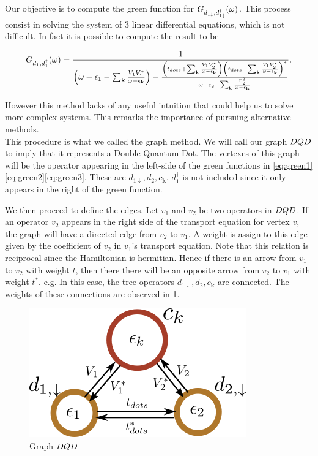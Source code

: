 Our objective is to compute the green function for $G_{d_{1\downarrow},d_{1\downarrow}^{\dagger}}(\omega)$. This process consist in solving the system of $3$ linear differential equations, which is not difficult.  In fact it is possible to compute the result to be 

\begin{equation}
G_{d_{1},d_{1}^{\dagger}}(\omega)=\frac{1}{\left(\omega-\epsilon_{1}-\sum_{\mathbf{k}}\frac{V_{1}V_{1}^{*}}{\omega-\epsilon_{\mathbf{k}}}\right)-\frac{\left(t_{dots}+\sum_{\mathbf{k}}\frac{V_{1}V_{2}^{*}}{\omega-\epsilon_{\mathbf{k}}}\right)\left(t_{dots}+\sum_{\mathbf{k}}\frac{V_{1}V_{2}^{*}}{\omega-\epsilon_{\mathbf{k}}}\right)^{*}}{\omega-\epsilon_{2}-\sum_{\mathbf{k}}\frac{\Gamma_{2}^{2}}{\omega-\epsilon_{\mathbf{k}}}}}. \label{eq:solGreen}
\end{equation}

However this method lacks of any useful intuition that could help us  to  solve more complex systems. This remarks the  importance of pursuing alternative methods. \\

This procedure is what we called the graph method.  We will call our graph $DQD$ to imply that it represents a Double Quantum Dot. The vertexes of this graph will be the operator appearing in the left-side of the green functions in  \eqref{eq:green1}\eqref{eq:green2}\eqref{eq:green3}. These  are $d_{1\downarrow},d_{2},c_{\boldsymbol{k}}$. $d_1^\dagger$ is not included since it only appears in the right of the green function. 

We then proceed to define the edges. Let $v_1$ and $v_2$ be two operators in $DQD$. If an operator $v_2$ appears in the right side of the transport equation for vertex $v$, the graph will have  a directed edge from $v_2$ to $v_1$. A weight is assign to this edge given by the coefficient of $v_2$ in $v_1$'s transport equation. Note that this relation is reciprocal since the Hamiltonian is hermitian. Hence if there is an arrow from $v_1$ to $v_2$ with weight $t$, then there there will be an opposite arrow from $v_2$ to $v_1$ with weight $t^*$. e.g. In this case, the tree operators  $d_{1\downarrow},d_{2},c_{\boldsymbol{k}}$ are connected. The weights of these connections are observed in \ref{fig:graphDQD}.\\

\begin{figure}[t]
    \centering
    \includegraphics[scale=0.7]{IMAGES/Graphs/DQD.png}
    \caption{ Graph $DQD$  \protect{}}
    \label{fig:graphDQD}
\end{figure}


